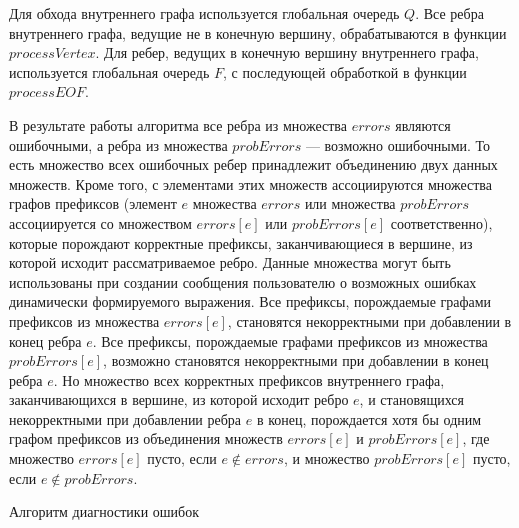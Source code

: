 Для обхода внутреннего графа используется глобальная очередь $Q$. Все ребра внутреннего графа, ведущие не в конечную вершину, обрабатываются в функции $processVertex$. Для ребер, ведущих в конечную вершину внутреннего графа, используется глобальная очередь $F$, с последующей обработкой в функции $processEOF$.

В результате работы алгоритма все ребра из множества $errors$ являются ошибочными, а ребра из множества $probErrors$ --- возможно ошибочными. То есть множество всех ошибочных ребер принадлежит объединению двух данных множеств. Кроме того, с элементами этих множеств ассоциируются множества графов префиксов (элемент $e$ множества $errors$ или множества $probErrors$ ассоциируется со множеством $errors[e]$ или $probErrors[e]$ соответственно), которые порождают корректные префиксы, заканчивающиеся в вершине, из которой исходит рассматриваемое ребро. Данные множества могут быть использованы при создании сообщения пользователю о возможных ошибках динамически формируемого выражения. Все префиксы, порождаемые графами префиксов из множества $errors[e]$, становятся некорректными при добавлении в конец ребра $e$. Все префиксы, порождаемые графами префиксов из множества $probErrors[e]$, возможно становятся некорректными при добавлении в конец ребра $e$. Но множество всех корректных префиксов внутреннего графа, заканчивающихся в вершине, из которой исходит ребро $e$, и становящихся некорректными при добавлении ребра $e$ в конец, порождается хотя бы одним графом префиксов из объединения множеств $errors[e]$ и $probErrors[e]$, где множество $errors[e]$ пусто, если $e \notin errors$, и множество $probErrors[e]$ пусто, если $e \notin probErrors$.

\begin{algorithm}[H]
\begin{algorithmic}[1]
\caption{Алгоритм диагностики ошибок}
\label{error_handling}
    \EndWhile
    \EndWhile
\EndFunction
\end{algorithmic}
\end{algorithm}

